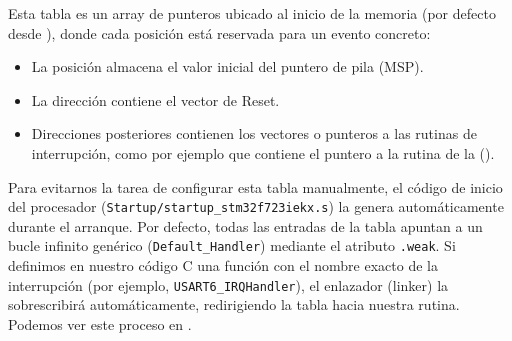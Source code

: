 \documentclass[../main.tex]{subfiles}
\begin{document}
            Esta tabla es un array de punteros ubicado al inicio de la memoria (por defecto desde ), donde cada posición está reservada para un evento concreto:

            \begin{itemize}
                \item La posición  almacena el valor inicial del puntero de pila (MSP).
                \item La dirección  contiene el vector de Reset.
                \item Direcciones posteriores contienen los vectores o punteros a las rutinas de interrupción, como por ejemplo  que contiene el puntero a la rutina de la  (\REFMAN[9.1.2]).
            \end{itemize}
            
            Para evitarnos la tarea de configurar esta tabla manualmente, el código de inicio del procesador (\texttt{Startup/startup\_stm32f723iekx.s}) la genera automáticamente durante el arranque. Por defecto, todas las entradas de la tabla apuntan a un bucle infinito genérico (\lstinline|Default_Handler|) mediante el atributo \lstinline|.weak|. Si definimos en nuestro código C una función con el nombre exacto de la interrupción (por ejemplo, \lstinline|USART6_IRQHandler|), el enlazador (linker) la sobrescribirá automáticamente, redirigiendo la tabla hacia nuestra rutina. Podemos ver este proceso en .
\end{document}
